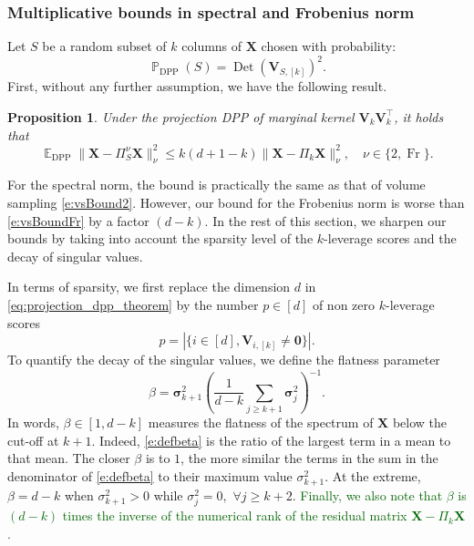\documentclass[twoside,11pt]{book}
\newcommand{\rev}[1]{\textcolor{darkgreen}{#1}}
\newtheorem{proposition}{Proposition}
\DeclareMathOperator{\Det}{Det}
\DeclareMathOperator{\Fr}{\mathrm{Fr}}
\DeclareMathOperator{\DPP}{\mathrm{DPP}}
\DeclareMathOperator{\Tran}{\intercal}
\DeclareMathOperator{\EX}{\mathbb{E}}
\DeclareMathOperator{\Prb}{\mathbb{P}}
\begin{document}
\subsubsection{Multiplicative bounds in spectral and Frobenius norm}
\label{sec:new_results_randomized}
Let $S$ be a random subset of $k$ columns of $\bm{X}$ chosen with probability:
\begin{equation}
	\Prb_{\DPP}(S) = \Det(\bm{V}_{S,[k]})^{2}.
\end{equation}
First, without any further assumption, we have the following result.
\begin{proposition}
    \label{projection_dpp_theorem}
    Under the projection DPP of marginal kernel $\bm{V}^{}_{k}\bm{V}^{\Tran}_{k}$, it holds that
    \begin{equation}
    	\label{eq:projection_dpp_theorem}
    	\EX_{\DPP} \| \bm{X} - \Pi_{S}^{\nu}\bm{X} \|_{\nu}^{2} \leq k(d+1-k)\| \bm{X} - \Pi_{k}\bm{X} \|_{\nu}^{2}, \quad \nu\in\{2,\Fr\}.
    \end{equation}
\end{proposition}
For the spectral norm, the bound is practically the same as that of volume sampling \eqref{e:vsBound2}. However, our bound for the Frobenius norm is worse than \eqref{e:vsBoundFr} by a factor $(d-k)$. In the rest of this section, we sharpen our bounds by taking into account the sparsity level of the $k$-leverage scores and the decay of singular values.

In terms of sparsity, we first replace the dimension $d$ in \eqref{eq:projection_dpp_theorem} by the number $p\in[d]$ of non zero $k$-leverage scores
\begin{equation}
  p = \left| \{i \in [d], \bm{V}_{i,[k]} \neq \bm{0}\}\right|.
  \label{e:defp}
\end{equation}
To quantify the decay of the singular values, we define the flatness parameter
\begin{equation}
  \beta = \bm{\sigma}_{k+1}^{2} \left(\frac{1}{d-k} \sum\limits_{j \geq k+1} \bm{\sigma}_{j}^{2}\right)^{-1}.
  \label{e:defbeta}
\end{equation}
In words, $\beta\in[1,d-k]$ measures the flatness of the spectrum of $\bm{X}$ below the cut-off at $k+1$. Indeed, \eqref{e:defbeta} is the ratio of the largest term in a mean to that mean. The closer $\beta$ is to $1$, the more similar the terms in the sum in the denominator of \eqref{e:defbeta} to their maximum value $\sigma_{k+1}^{2}$. At the extreme, $\beta=d-k$ when $\sigma^2_{k+1}>0$ while $\sigma_j^2=0,$ $\forall j\geq k+2$. \rev{Finally, we also note that $\beta$ is $(d-k)$ times the inverse of the numerical rank \citep{RuVe07} of the residual matrix $\bm{X}-\Pi_{k}\bm{X}$.}
\end{document}
